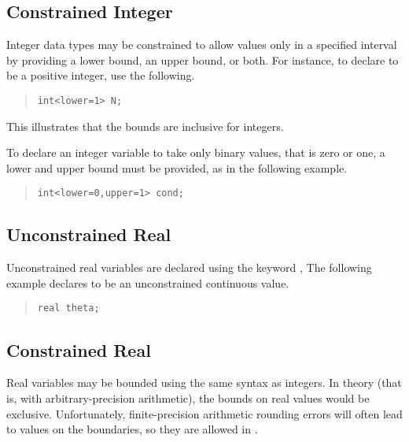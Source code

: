 \subsection{Constrained Integer}

Integer data types may be constrained to allow values only in a
specified interval by providing a lower bound, an upper bound, or
both.  For instance, to declare  to be a positive integer, use
the following.
%
\begin{quote}
\begin{Verbatim}[fontsize=\small]
int<lower=1> N;
\end{Verbatim}
\end{quote}
%
This illustrates that the bounds are inclusive for integers.

To declare an integer variable  to take only binary values,
that is zero or one, a lower and upper bound must be provided, as in
the following example.
%
\begin{quote}
\begin{Verbatim} 
int<lower=0,upper=1> cond;
\end{Verbatim}
\end{quote}


\subsection{Unconstrained Real}

Unconstrained real variables are declared using the keyword
, The following example declares  to be an
unconstrained continuous value.
%
\begin{quote}
\begin{Verbatim}[fontsize=\small]
real theta;
\end{Verbatim}
\end{quote}
%

\subsection{Constrained Real}

Real variables may be bounded using the same syntax as integers.  In
theory (that is, with arbitrary-precision arithmetic), the bounds on
real values would be exclusive.  Unfortunately, finite-precision
arithmetic rounding errors will often lead to values on the
boundaries, so they are allowed in \Stan.
 
